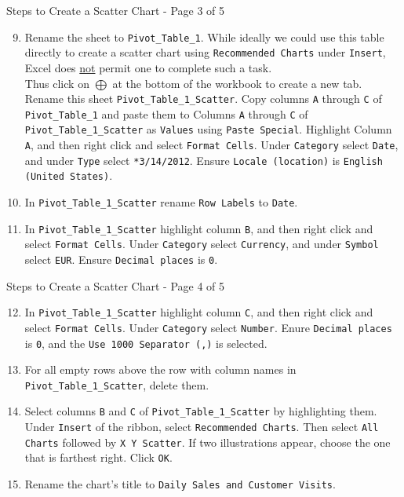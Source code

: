 \documentclass[pdf]{beamer}
\theoremstyle{remark}
\theoremstyle{definition}
\begin{document}
\begin{frame}[t]{Steps to Create a Scatter Chart - Page 3 of 5}
 \small 
\begin{enumerate}
\setcounter{enumi}{8}
 \item  Rename the sheet to \texttt{Pivot\_Table\_1}.  While ideally we could use this table directly to create a scatter chart using \texttt{Recommended Charts} under \texttt{Insert}, Excel does \underline{not} permit one to complete such a task.  \\
 Thus click on \texttt{$\bigoplus$} at the bottom of the workbook to create a new tab.  Rename this sheet \texttt{Pivot\_Table\_1\_Scatter}.  Copy columns \texttt{A} through \texttt{C} of \texttt{Pivot\_Table\_1} and paste them to Columns \texttt{A} through \texttt{C} of \texttt{Pivot\_Table\_1\_Scatter}  as \texttt{Values} using \texttt{Paste Special}. Highlight Column \texttt{A}, and then right click and select \texttt{Format Cells}.   Under \texttt{Category} select \texttt{Date}, and under \texttt{Type} select \texttt{*3/14/2012}.  Ensure \texttt{Locale (location)} is \texttt{English (United States)}.
\item In  \texttt{Pivot\_Table\_1\_Scatter} rename \texttt{Row Labels} to \texttt{Date}.  
\item In  \texttt{Pivot\_Table\_1\_Scatter} highlight column \texttt{B}, and then right click and select \texttt{Format Cells}.   Under \texttt{Category} select \texttt{Currency}, and under \texttt{Symbol} select \texttt{EUR}. Ensure \texttt{Decimal places} is \texttt{0}.
\end{enumerate}
\end{frame}

\begin{frame}[t]{Steps to Create a Scatter Chart - Page 4 of 5}
 \small 
\begin{enumerate}
\setcounter{enumi}{11}
\item In  \texttt{Pivot\_Table\_1\_Scatter} highlight column \texttt{C}, and then right click and select \texttt{Format Cells}.   Under \texttt{Category} select \texttt{Number}.  Enure \texttt{Decimal places} is \texttt{0}, and the \texttt{Use 1000 Separator (,)} is selected.  
\item For all empty rows above the row with column names in \texttt{Pivot\_Table\_1\_Scatter}, delete them.
\item Select columns \texttt{B} and \texttt{C} of  \texttt{Pivot\_Table\_1\_Scatter} by highlighting them.  Under  \texttt{Insert} of the ribbon, select  \texttt{Recommended Charts}.  Then select \texttt{All Charts} followed by  \texttt{X Y Scatter}.  If two illustrations appear, choose the one that is farthest right.  Click  \texttt{OK}.
\item Rename the chart's title to  \texttt{Daily Sales and Customer Visits}. 
\end{enumerate}
\end{frame}
\end{document}
